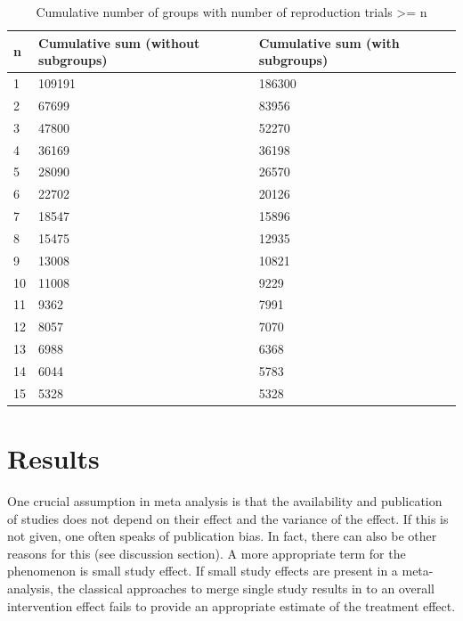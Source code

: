 \documentclass[11pt,a4paper,twoside]{book}\usepackage[]{graphicx}\usepackage[]{color}
\begin{document}
\begin{table}[ht]
\centering
\begingroup\footnotesize
\begin{tabular}{lll}
  \hline
n & Cumulative sum (without subgroups) & Cumulative sum (with subgroups) \\ 
  \hline
1 & 109191 & 186300 \\ 
  2 & 67699 & 83956 \\ 
  3 & 47800 & 52270 \\ 
  4 & 36169 & 36198 \\ 
  5 & 28090 & 26570 \\ 
  6 & 22702 & 20126 \\ 
  7 & 18547 & 15896 \\ 
  8 & 15475 & 12935 \\ 
  9 & 13008 & 10821 \\ 
  10 & 11008 & 9229 \\ 
  11 & 9362 & 7991 \\ 
  12 & 8057 & 7070 \\ 
  13 & 6988 & 6368 \\ 
  14 & 6044 & 5783 \\ 
  15 & 5328 & 5328 \\ 
   \hline
\end{tabular}
\endgroup
\caption{Cumulative number of groups with number of reproduction trials >= n} 
\label{repr.groups}
\end{table}

















\chapter{Results}

One crucial assumption in meta analysis is that the availability and publication of studies does not depend on their effect and the variance of the effect. If this is not given, one often speaks of publication bias. In fact, there can also be other reasons for this (see discussion section). A more appropriate term for the phenomenon is small study effect. If small study effects are present in a meta-analysis, the classical approaches to merge single study results in to an overall intervention effect fails to provide an appropriate estimate of the treatment effect. 
\end{document}
